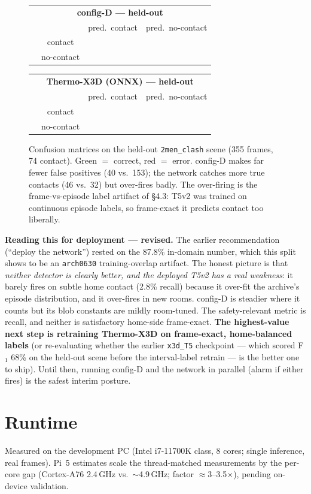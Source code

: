 \documentclass[11pt]{article}
\newcommand{\code}[1]{\texttt{\small #1}}
\newcommand{\cmcell}[2]{\cellcolor{#1}\makebox[11mm]{#2}}
\newcommand{\confmat}[5]{%
\setlength{\tabcolsep}{4pt}%
\begin{tabular}{cccc}
\multicolumn{4}{c}{\small\textbf{#1}}\\[2pt]
 & & \scriptsize pred.\ contact & \scriptsize pred.\ no-contact\\[1pt]
\multirow{2}{*}{\rotatebox{90}{\scriptsize actual}}
 & \scriptsize contact    & \cmcell{good}{#2} & \cmcell{bad}{#3}\\[1pt]
 & \scriptsize no-contact & \cmcell{bad}{#4} & \cmcell{good}{#5}\\
\end{tabular}}
\begin{document}
\begin{figure}[H]\centering
\confmat{config-D --- held-out}{32}{42}{40}{241}
\hspace{14mm}
\confmat{Thermo-X3D (ONNX) --- held-out}{46}{28}{153}{128}
\caption{Confusion matrices on the held-out \code{2men\_clash} scene (355
frames, 74 contact). Green $=$ correct, red $=$ error. config-D makes far
fewer false positives (40 vs.\ 153); the network catches more true
contacts (46 vs.\ 32) but over-fires badly. The over-firing is the
frame-vs-episode label artifact of \S4.3: T5v2 was trained on continuous
episode labels, so frame-exact it predicts contact too liberally.}
\end{figure}

\noindent \textbf{Reading this for deployment --- revised.} The earlier
recommendation (``deploy the network'') rested on the 87.8\% in-domain
number, which this split shows to be an \code{arch0630} training-overlap
artifact. The honest picture is that \emph{neither detector is clearly
better, and the deployed T5v2 has a real weakness}: it barely fires on
subtle home contact (2.8\% recall) because it over-fit the archive's
episode distribution, and it over-fires in new rooms. config-D is steadier
where it counts but its blob constants are mildly room-tuned. The
safety-relevant metric is recall, and neither is satisfactory home-side
frame-exact. \textbf{The highest-value next step is retraining Thermo-X3D on
frame-exact, home-balanced labels} (or re-evaluating whether the earlier
\code{x3d\_T5} checkpoint --- which scored F$_1$ 68\% on the held-out scene
before the interval-label retrain --- is the better one to ship). Until
then, running config-D and the network in parallel (alarm if either fires)
is the safest interim posture.

\section{Runtime}

Measured on the development PC (Intel i7-11700K class, 8 cores; single
inference, real frames). Pi~5 estimates scale the thread-matched
measurements by the per-core gap (Cortex-A76 2.4\,GHz vs.\ $\sim$4.9\,GHz;
factor $\approx$3--3.5$\times$), pending on-device validation.
\end{document}
